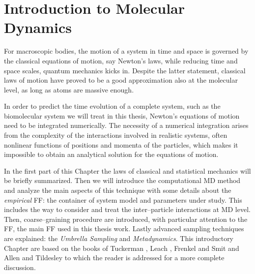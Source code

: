\chapter{Introduction to Molecular Dynamics}
For macroscopic bodies, the motion of a system in time and space is governed by the classical equations of 
motion, say Newton’s laws, while reducing time and space scales, quantum mechanics kicks in. Despite the latter 
statement, classical laws of motion have proved to be a good approximation also at the molecular level, as long 
as atoms are massive enough.

In order to predict the time evolution of a complete system, such as the biomolecular system we will treat in 
this thesis, Newton’s equations of motion need to be integrated numerically. The necessity of a numerical 
integration arises from the complexity of the interactions involved in realistic systems, often nonlinear 
functions of positions and momenta of the particles, which makes it impossible to obtain an analytical solution 
for the equations of motion.

In the first part of this Chapter the laws of classical and statistical mechanics will be briefly summarized.
Then we will introduce the computational \acf{MD} method and analyze the main aspects of this technique with some 
details about the \textit{empirical} \ac{FF}: the container of system model and parameters under study. This 
includes the way to consider and treat the inter--particle interactions at \ac{MD} level. Then, coarse--graining 
procedure are introduced, with particular attention to the \martini \ac{FF}, the main \ac{FF} used in this thesis 
work. Lastly advanced sampling techniques are explained: the \textit{Umbrella Sampling} and 
\textit{Metadynamics}. This introductory Chapter are based on the books of Tuckerman \cite{Tuckerman}, Leach 
\cite{Leach}, Frenkel and Smit \cite{Frenkel} and Allen and Tildesley \cite{Allen} to which the reader is 
addressed for a more complete discussion.

